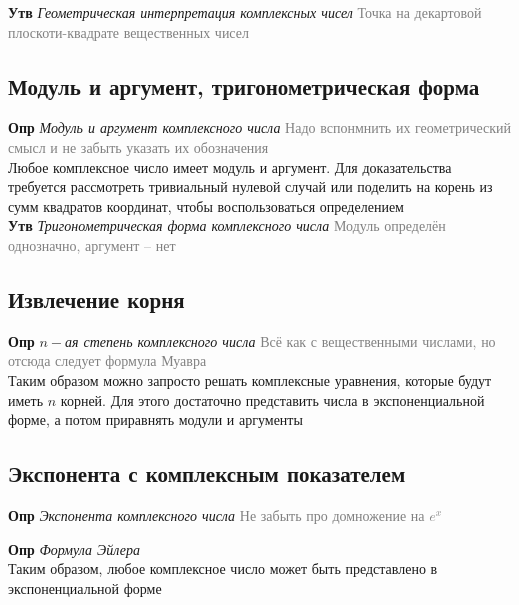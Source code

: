 \documentclass[a4paper, 14pt]{article}
\begin{document}
    \textbf{Утв} \textit{Геометрическая интерпретация комплексных чисел} \textcolor{gray}{Точка на декартовой
    плоскоти-квадрате вещественных чисел}
    
    \subsection{Модуль и аргумент, тригонометрическая форма}
    
    \textbf{Опр} \textit{Модуль и аргумент комплексного числа} \textcolor{gray}{Надо вспонмнить их геометрический
    смысл и не забыть указать их обозначения} \\
    
    Любое комплексное число имеет модуль и аргумент.
    Для доказательства требуется рассмотреть тривиальный нулевой
    случай или поделить на корень из сумм квадратов координат, чтобы воспользоваться определением \\
    
    \textbf{Утв} \textit{Тригонометрическая форма комплексного числа} \textcolor{gray}{Модуль определён однозначно,
        аргумент -- нет}
    
    \subsection{Извлечение корня}
    
    \textbf{Опр} \textit{$n-$ая степень комплексного числа} \textcolor{gray}{Всё как с вещественными числами, но
    отсюда следует формула Муавра} \\
    
    Таким образом можно запросто решать комплексные уравнения, которые будут иметь $n$ корней.
    Для этого достаточно
    представить числа в экспоненциальной форме, а потом приравнять модули и аргументы
    
    \subsection{Экспонента с комплексным показателем}
    
    \textbf{Опр} \textit{Экспонента комплексного числа} \textcolor{gray}{Не забыть про домножение на $e^x$}
    
    \textbf{Опр} \textit{Формула Эйлера} \\
    
    Таким образом, любое комплексное число может быть представлено в экспоненциальной форме \\
    
\end{document}
